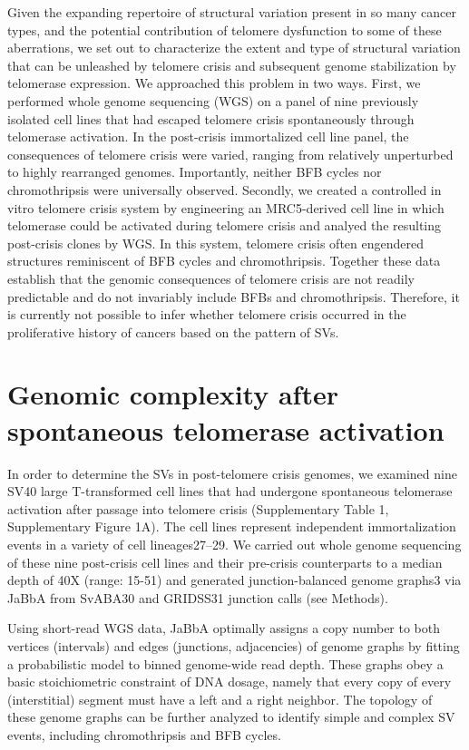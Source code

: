 \documentclass[phd,tocprelim]{cornell}
\begin{document}
Given the expanding repertoire of structural variation present in so many cancer types, and the potential contribution of telomere dysfunction to some of these aberrations, we set out to characterize the extent and type of structural variation that can be unleashed by telomere crisis and subsequent genome stabilization by telomerase expression. We approached this problem in two ways. First, we performed whole genome sequencing (WGS) on a panel of nine previously isolated cell lines that had escaped telomere crisis spontaneously through telomerase activation. In the post-crisis immortalized cell line panel, the consequences of telomere crisis were varied, ranging from relatively unperturbed to highly rearranged genomes. Importantly, neither BFB cycles nor chromothripsis were universally observed. Secondly, we created a controlled in vitro telomere crisis system by engineering an MRC5-derived cell line in which telomerase could be activated during telomere crisis and analyed the resulting post-crisis clones by WGS.  In this system, telomere crisis often engendered structures reminiscent of BFB cycles and chromothripsis. Together these data establish that the genomic consequences of telomere crisis are not readily predictable and do not invariably include BFBs and chromothripsis. Therefore, it is currently not possible to infer whether telomere crisis occurred in the proliferative history of cancers based on the pattern of SVs. 


\section{Genomic complexity after spontaneous telomerase activation}
In order to determine the SVs in post-telomere crisis genomes, we examined nine SV40 large T-transformed cell lines that had undergone spontaneous telomerase activation after passage into telomere crisis (Supplementary Table 1, Supplementary Figure 1A). The cell lines represent independent immortalization events in a variety of cell lineages27–29. We carried out whole genome sequencing of these nine post-crisis cell lines and their pre-crisis counterparts to a median depth of 40X (range: 15-51) and generated junction-balanced genome graphs3 via JaBbA from SvABA30 and GRIDSS31 junction calls (see Methods).  

Using short-read WGS data, JaBbA optimally assigns a copy number to both vertices (intervals) and edges (junctions, adjacencies) of genome graphs by fitting a probabilistic model to binned genome-wide read depth. These graphs obey a basic stoichiometric constraint of DNA dosage, namely that every copy of every (interstitial) segment must have a left and a right neighbor. The topology of these genome graphs can be further analyzed to identify simple and complex SV events, including chromothripsis and BFB cycles. 
\end{document}
